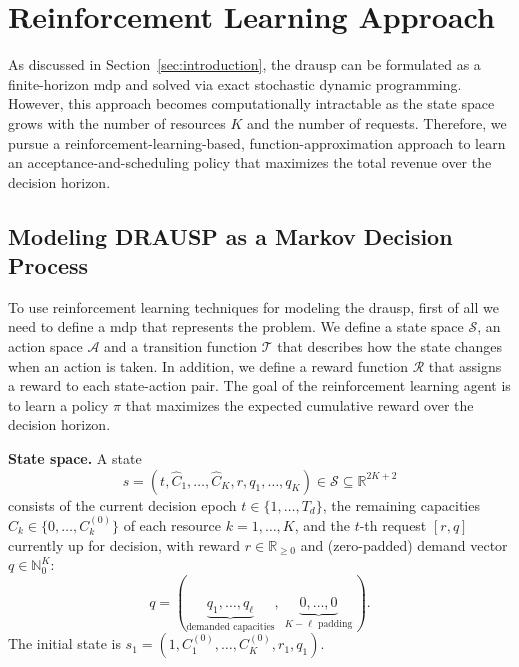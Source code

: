 \section{Reinforcement Learning Approach}
\label{sec:rl-approach}
As discussed in Section~\ref{sec:introduction}, the \acs{drausp} can be formulated as a finite-horizon \acs{mdp} and solved via exact stochastic dynamic programming. However, this approach becomes computationally intractable as the state space grows with the number of resources $K$ and the number of requests. Therefore, we pursue a reinforcement-learning-based, function-approximation approach to learn an acceptance-and-scheduling policy that maximizes the total revenue over the decision horizon.

\subsection{Modeling DRAUSP as a Markov Decision Process}
To use reinforcement learning techniques for modeling the \ac{drausp}, first of all we need to define
a \ac{mdp} that represents the problem. We define a state space $\mathcal{S}$, an action space $\mathcal{A}$ and a transition function $\mathcal{T}$ that describes how the state changes when an action is taken. In addition, we define a reward function $\mathcal{R}$ that assigns a reward to each state-action pair. The goal of the reinforcement learning agent is to learn a policy $\pi$ that maximizes the expected cumulative reward over the decision horizon.

\textbf{State space.} A state
\begin{equation}
  \label{eq:state}
  s = (t, \hat C_1, \dots, \hat C_K, r, q_1, \dots, q_K) \in \mathcal{S} \subseteq \mathbb{R}^{2K+2}
\end{equation}
consists of the current decision epoch $t \in \{1,\dots,T_d\}$, the remaining capacities
$\hat C_k \in \{0,\dots,C_k^{(0)}\}$ of each resource $k=1,\dots,K$, and the $t$-th request $[r,q]$
currently up for decision, with reward $r \in \mathbb{R}_{\ge 0}$ and (zero-padded) demand vector
$q \in \mathbb{N}_0^K$:
\begin{equation}
  \label{eq:padding}
  q = (\underbrace{q_1, \dots, q_\ell}_{\text{demanded capacities}},\; \underbrace{0, \dots, 0}_{K-\ell \text{ padding}}\,).
\end{equation}
The initial state is $s_1 = (1, C_1^{(0)}, \dots, C_K^{(0)}, r_1, q_1)$.

